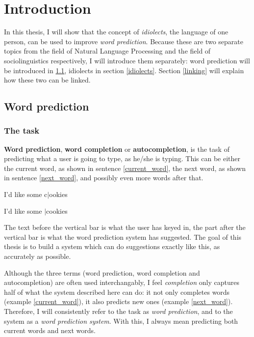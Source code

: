 \documentclass[12pt]{article}
\let\stdsection\section
\renewcommand\section{\newpage\stdsection}
\begin{document}
\section{Introduction} \label{intro}

In this thesis, I will show that the concept of \emph{idiolects}, the language of one person, can be used to improve \emph{word prediction}. Because these are two separate topics from the field of Natural Language Processing and the field of sociolinguistics respectively, I will introduce them separately: word prediction will be introduced in \ref{word_prediction}, idiolects in section \ref{idiolects}. Section \ref{linking} will explain how these two can be linked.

\subsection{Word prediction} \label{word_prediction}

\subsubsection{The task}

\textbf{Word prediction}, \textbf{word completion} or \textbf{autocompletion}, is the task of predicting what a user is going to type, as he/she is typing. This can be either the current word, as shown in sentence \ref{current_word}, the next word, as shown in sentence \ref{next_word}, and possibly even more words after that. 
\begin{examples}
\item I'd like some c$|$ookies \label{current_word}
\item I'd like some $|$cookies \label{next_word}
\end{examples}

The text before the vertical bar is what the user has keyed in, the part after the vertical bar is what the word prediction system has suggested. The goal of this thesis is to build a system which can do suggestions exactly like this, as accurately as possible. 

Although the three terms (word prediction, word completion and autocompletion) are often used interchangably, I feel \emph{completion} only captures half of what the system described here can do: it not only completes words (example \ref{current_word}), it also predicts new ones (example \ref{next_word}). Therefore, I will consistently refer to the task as \emph{word prediction}, and to the system as a \emph{word prediction system}. With this, I always mean predicting both current words and next words.
\end{document}
